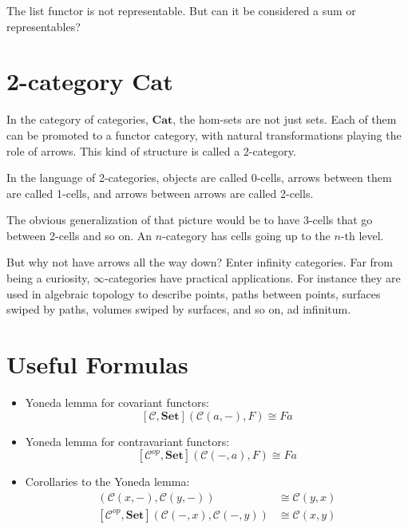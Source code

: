 \documentclass[DaoFP]{subfiles}
\begin{document}
\begin{exercise}
The list functor is not representable. But can it be considered a sum or representables?
\end{exercise}

\section{2-category  $\mathbf{Cat}$ }

In the category of categories, $\mathbf{Cat}$, the hom-sets are not just sets. Each of them can be promoted to a functor category, with natural transformations playing the role of arrows. This kind of structure is called a 2-category. 

In the language of 2-categories, objects are called 0-cells, arrows between them are called 1-cells, and arrows between arrows are called 2-cells. 

The obvious generalization of that picture would be to have 3-cells that go between 2-cells and so on. An $n$-category has cells going up to the $n$-th level. 

But why not have arrows all the way down? Enter infinity categories. Far from being a curiosity, $\infty$-categories have practical applications. For instance they are used in algebraic topology to describe points, paths between points, surfaces swiped by paths, volumes swiped by surfaces, and so on, ad infinitum. 

\section{Useful Formulas}
\begin{itemize}
\item Yoneda lemma for covariant functors:
\[ [\mathcal{C}, \mathbf{Set}]( \mathcal{C}(a, -), F) \cong F a \]
\item Yoneda lemma for contravariant functors:
\[ [\mathcal{C}^{op}, \mathbf{Set}]( \mathcal{C}(-, a), F) \cong F a \]
\item Corollaries to the Yoneda lemma:
\begin{align*}
 [\mathcal{C}, \mathbf{Set}]( \mathcal{C}(x, -), \mathcal{C}(y, -)) &\cong \mathcal{C}(y, x) \\
 [\mathcal{C}^{op}, \mathbf{Set}]( \mathcal{C}(-, x), \mathcal{C}(-, y)) &\cong \mathcal{C}(x, y)
\end{align*}

\end{itemize}
\end{document}
